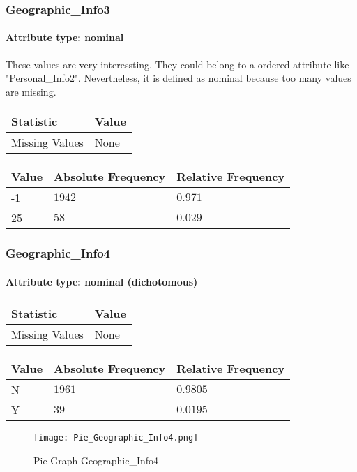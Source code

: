 \subsubsection{Geographic\_Info3}
\paragraph{Attribute type: nominal} These values are very interessting. They could belong to a ordered attribute like "Personal\_Info2". Nevertheless, it is defined as nominal because too many values are missing.

\begin{table}[H]
	\renewcommand{\arraystretch}{1.25}
	\begin{tabular}{l|l}
		\textbf{Statistic} & \textbf{Value}\\\hline
		Missing Values& None\\\hline
	\end{tabular}
\end{table}
\begin{table}[H]
	\renewcommand{\arraystretch}{1.25}
	\begin{tabular}{l|l|l}
		\textbf{Value} & \textbf{Absolute Frequency} & \textbf{Relative Frequency}\\\hline
		-1&$1942$&$0.971$\\\hline
		25&$58$&$0.029$
	\end{tabular}
\end{table}

\subsubsection{Geographic\_Info4}
\paragraph{Attribute type: nominal (dichotomous)}\quad

\begin{table}[H]
	\renewcommand{\arraystretch}{1.25}
	\begin{tabular}{l|l}
		\textbf{Statistic} & \textbf{Value}\\\hline
		Missing Values& None\\\hline
	\end{tabular}
\end{table}
\begin{table}[H]
	\renewcommand{\arraystretch}{1.25}
	\begin{tabular}{l|l|l}
		\textbf{Value} & \textbf{Absolute Frequency} & \textbf{Relative Frequency}\\\hline
		N&$1961$&$0.9805$\\\hline
		Y&$39$&$0.0195$
	\end{tabular}
\end{table}
\begin{figure}[H]
	\begin{center}
		\texttt{[image: Pie\_Geographic\_Info4.png]}
	\end{center}
	\caption{Pie Graph Geographic\_Info4}
\end{figure}

